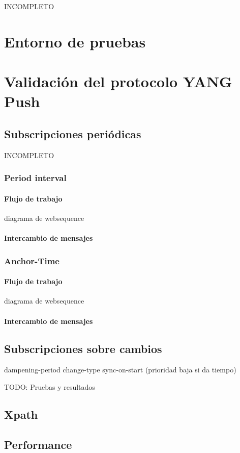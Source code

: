 
INCOMPLETO
\section{Entorno de pruebas}

\section{Validación del protocolo YANG Push}

\subsection{Subscripciones periódicas}
INCOMPLETO

\subsubsection{Period interval}

\paragraph{Flujo de trabajo}

diagrama de websequence

\paragraph{Intercambio de mensajes}


\subsubsection{Anchor-Time}

\paragraph{Flujo de trabajo}

diagrama de websequence

\paragraph{Intercambio de mensajes}



\subsection{Subscripciones sobre cambios}

dampening-period
change-type
sync-on-start (prioridad baja si da tiempo)

TODO: Pruebas y resultados

\subsection{Xpath}

\subsection{Performance}

